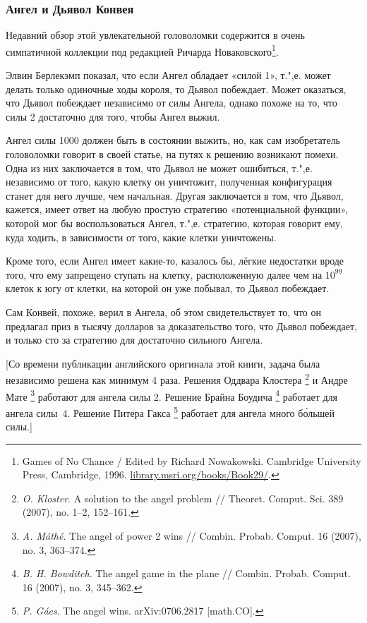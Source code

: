 \documentclass[twoside]{book}
\begin{document}
\subsubsection*{Ангел и Дьявол Конвея}

Недавний обзор этой увлекательной головоломки содержится в очень симпатичной коллекции под редакцией Ричарда Новаковского\footnote{{Games of No Chance} / Edited by Richard Nowakowski. Cambridge University Press, Cambridge, 1996. \href{http://library.msri.org/books/Book29/}{\url{library.msri.org/books/Book29/}}.}. 

Элвин Берлекэмп показал, что если Ангел обладает «силой 1», т.",е. может делать только одиночные ходы короля, то Дьявол побеждает.
Может оказаться, что Дьявол побеждает независимо от силы Ангела,
однако похоже на то, что силы 2 достаточно для того, чтобы Ангел выжил.

Ангел силы 1000 должен быть в состоянии выжить, но, как сам изобретатель головоломки говорит в своей статье, на путях к решению возникают помехи.
Одна из них заключается в том, что Дьявол не может ошибиться,
т.",е. независимо от того, какую клетку он уничтожит, полученная конфигурация станет для него лучше, чем начальная.
Другая заключается в том, что Дьявол, кажется, имеет ответ на любую простую стратегию «потенциальной функции», которой мог бы воспользоваться Ангел,
т.",е. стратегию, которая говорит ему, куда ходить, в зависимости от того, какие клетки уничтожены. 

Кроме того, если Ангел имеет какие-то, казалось бы, лёгкие недостатки вроде того, что ему запрещено ступать на клетку, расположенную далее чем на $10^{99}$ клеток к югу от клетки, на которой он уже побывал, то Дьявол побеждает.

Сам Конвей, похоже, верил в Ангела, об этом свидетельствует то, что он предлагал приз в тысячу долларов за доказательство того, что Дьявол побеждает, и только сто за стратегию для достаточно сильного Ангела.

[Со времени публикации английского оригинала этой книги, задача была независимо решена как минимум 4 раза.
Решения Оддвара Клостера%
\footnote{
\emph{O. Kloster}. 
A solution to the angel problem /\!/
{Theoret. Comput. Sci.} 389 (2007), no. 1--2, 152--161.}
и Андре Мате%
\footnote{
\emph{A. Máthé}. 
The angel of power 2 wins /\!/ 
{Combin. Probab. Comput.} 16 (2007), no. 3, 363–374.}
работают для ангела силы 2.
Решение Брайна Боудича%
\footnote{\emph{B. H. Bowditch}.
  The angel game in the plane /\!/ {Combin. Probab. Comput.} 16 (2007), no. 3, 345--362.}
работает для ангела силы~4.
Решение Питера Гакса%
\footnote{\emph{P. G\'{a}cs}. {The angel wins.} arXiv:0706.2817 [math.CO].}
работает для ангела много б\'{о}льшей силы.] %
\end{document}
